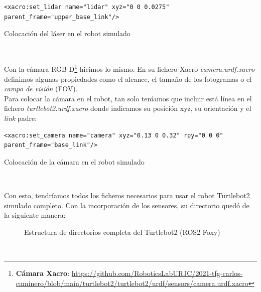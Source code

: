 \begin{code}[H]
\begin{lstlisting}
<xacro:set_lidar name="lidar" xyz="0 0 0.0275" parent_frame="upper_base_link"/>
\end{lstlisting}
\caption{Colocación del láser en el robot simulado}
\label{fig:colocacion_laser_simulado}
\end{code}\

Con la cámara RGB-D\footnote{\textbf{Cámara Xacro}: \url{https://github.com/RoboticsLabURJC/2021-tfg-carlos-caminero/blob/main/turtlebot2/turtlebot2/urdf/sensors/camera.urdf.xacro}} hicimos lo mismo. En su fichero Xacro \textit{camera.urdf.xacro} definimos algunas propiedades como el alcance, el tamaño de los fotogramas o el \textit{campo de visión} (FOV).\\

Para colocar la cámara en el robot, tan solo teníamos que incluir está línea en el fichero \textit{turtlebot2.urdf.xacro} donde indicamos su posición xyz, su orientación y el \textit{link} padre:\\

\begin{code}[H]
\begin{lstlisting}
<xacro:set_camera name="camera" xyz="0.13 0 0.32" rpy="0 0 0" parent_frame="base_link"/>
\end{lstlisting}
\caption{Colocación de la cámara en el robot simulado}
\label{fig:colocacion_camara_simulado}
\end{code}\

Con esto, tendríamos todos los ficheros necesarios para usar el robot Turtlebot2 simulado completo. Con la incorporación de los sensores, su directorio quedó de la siguiente manera:

\begin{figure}[H]
	\begin{center}
	    \setlength{\fboxsep}{0.5cm}
	    \caption{Estructura de directorios completa del Turtlebot2 (ROS2 Foxy)}
	    \label{fig:directorios_turtlebot2}
	\end{center}
\end{figure}\

